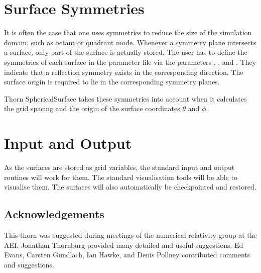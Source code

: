 \section{Surface Symmetries}

It is often the case that one uses symmetries to reduce the size of
the simulation domain, such as octant or quadrant mode.  Whenever a
symmetry plane intersects a surface, only part of the surface is
actually stored.  The user has to define the symmetries of each
surface in the parameter file via the parameters
, , and
.  They indicate that a 
reflection symmetry exists in the corresponding direction.  The
surface origin is required to lie in the corresponding symmetry
planes.

Thorn SphericalSurface takes these symmetries into account when it
calculates the grid spacing and the origin of the surface coordinates
$\theta$ and $\phi$.



\section{Input and Output}

As the surfaces are stored as grid variables, the standard input and
output routines will work for them.  The standard visualisation tools
will be able to visualise them.  The surfaces will also automatically
be checkpointed and restored.



\subsection{Acknowledgements}

This thorn was suggested during meetings of the numerical relativity
group at the AEI.  Jonathan Thornburg provided many detailed and
useful suggestions.  Ed Evans, Carsten Gundlach, Ian Hawke, and Denis
Pollney contributed comments and suggestions.



